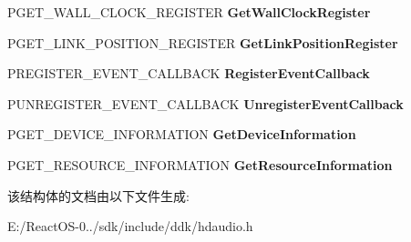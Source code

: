 \begin{DoxyCompactItemize}
P\+G\+E\+T\+\_\+\+W\+A\+L\+L\+\_\+\+C\+L\+O\+C\+K\+\_\+\+R\+E\+G\+I\+S\+T\+ER {\bfseries Get\+Wall\+Clock\+Register}
\item 
\mbox{\label{struct___h_d_a_u_d_i_o___b_u_s___i_n_t_e_r_f_a_c_e_afae9800dd10ac7aacb454764ed727dfb}} 
P\+G\+E\+T\+\_\+\+L\+I\+N\+K\+\_\+\+P\+O\+S\+I\+T\+I\+O\+N\+\_\+\+R\+E\+G\+I\+S\+T\+ER {\bfseries Get\+Link\+Position\+Register}
\item 
\mbox{\label{struct___h_d_a_u_d_i_o___b_u_s___i_n_t_e_r_f_a_c_e_a7dffa6b5dd646366dec51a02b17297c6}} 
P\+R\+E\+G\+I\+S\+T\+E\+R\+\_\+\+E\+V\+E\+N\+T\+\_\+\+C\+A\+L\+L\+B\+A\+CK {\bfseries Register\+Event\+Callback}
\item 
\mbox{\label{struct___h_d_a_u_d_i_o___b_u_s___i_n_t_e_r_f_a_c_e_a439dc40c6116c3b3be58cef21486e6d7}} 
P\+U\+N\+R\+E\+G\+I\+S\+T\+E\+R\+\_\+\+E\+V\+E\+N\+T\+\_\+\+C\+A\+L\+L\+B\+A\+CK {\bfseries Unregister\+Event\+Callback}
\item 
\mbox{\label{struct___h_d_a_u_d_i_o___b_u_s___i_n_t_e_r_f_a_c_e_a757b44fe0f59b807a58340544dea1fd0}} 
P\+G\+E\+T\+\_\+\+D\+E\+V\+I\+C\+E\+\_\+\+I\+N\+F\+O\+R\+M\+A\+T\+I\+ON {\bfseries Get\+Device\+Information}
\item 
\mbox{\label{struct___h_d_a_u_d_i_o___b_u_s___i_n_t_e_r_f_a_c_e_ad866b3fbfd47ec38e6bc124801dcd785}} 
P\+G\+E\+T\+\_\+\+R\+E\+S\+O\+U\+R\+C\+E\+\_\+\+I\+N\+F\+O\+R\+M\+A\+T\+I\+ON {\bfseries Get\+Resource\+Information}
\end{DoxyCompactItemize}


该结构体的文档由以下文件生成\+:\begin{DoxyCompactItemize}
\item 
E\+:/\+React\+O\+S-\/0../sdk/include/ddk/hdaudio.\+h\end{DoxyCompactItemize}
